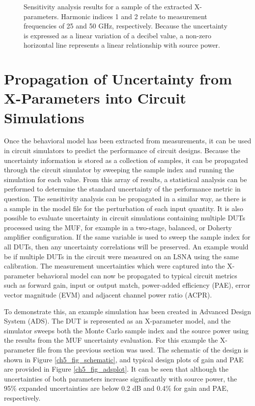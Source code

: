 \documentclass[../thesis/thesis.tex]{subfiles}
\begin{document}
\begin{refsection}
\begin{figure}
\begin{subfigure}{0.45\textwidth}
		\label{ch5_fig_t2121phasesens}
	\end{subfigure}
	\caption[Sensitivity analysis results for a sample of the extracted X-parameters.]{Sensitivity analysis results for a sample of the extracted X-parameters. Harmonic indices 1 and 2 relate to measurement frequencies of 25 and 50 GHz, respectively. Because the uncertainty is expressed as a linear variation of a decibel value, a non-zero horizontal line represents a linear relationship with source power.}
	\label{ch5_fig_sensplots}
\end{figure}

\section{Propagation of Uncertainty from X-Parameters into Circuit Simulations}

Once the behavioral model has been extracted from measurements, it can be used in circuit simulators to predict the performance of circuit designs. Because the uncertainty information is stored as a collection of samples, it can be propagated through the circuit simulator by sweeping the sample index and running the simulation for each value. From this array of results, a statistical analysis can be performed to determine the standard uncertainty of the performance metric in question. The sensitivity analysis can be propagated in a similar way, as there is a sample in the model file for the perturbation of each input quantity. It is also possible to evaluate uncertainty in circuit simulations containing multiple DUTs processed using the MUF, for example in a two-stage, balanced, or Doherty amplifier configuration. If the same variable is used to sweep the sample index for all DUTs, then any uncertainty correlations will be preserved. An example would be if multiple DUTs in the circuit were measured on an LSNA using the same calibration.
The measurement uncertainties which were captured into the X-parameter behavioral model can now be propagated to typical circuit metrics such as forward gain, input or output match, power-added efficiency (PAE), error vector magnitude (EVM) and adjacent channel power ratio (ACPR).

To demonstrate this, an example simulation has been created in Advanced Design System (ADS). The DUT is represented as an X-parameter model, and the simulator sweeps both the Monte Carlo sample index and the source power using the results from the MUF uncertainty evaluation. For this example the X-parameter file from the previous section was used. The schematic of the design is shown in Figure \ref{ch5_fig_schematic}, and typical design plots of gain and PAE are provided in Figure \ref{ch5_fig_adsplot}. It can be seen that although the uncertainties of both parameters increase significantly with source power, the 95\% expanded uncertainties are below 0.2 dB and 0.4\% for gain and PAE, respectively.


\end{refsection}
\end{document}
